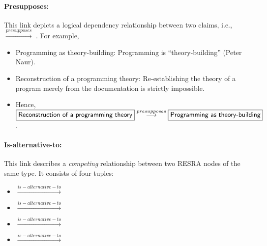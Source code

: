 \paragraph{Presupposes:}

This link depicts a logical dependency relationship between two claims,
i.e.,  \(
\stackrel{presupposes}{\longrightarrow} \) . For
example,

\small
\begin{itemize}
\item {\sf Programming as theory-building:\/} Programming is
  ``theory-building'' (Peter Naur).
  
\item {\sf Reconstruction of a programming theory:} Re-establishing the
  theory of a program merely from the documentation is strictly impossible.
  
\item Hence, \hspace{.01in}\( \fbox{{\sf Reconstruction of a programming
  theory\/}} \stackrel{presupposes}{\longrightarrow} \fbox{{\sf Programming
  as theory-building}} \).
\end{itemize}
\normalsize


\paragraph{Is-alternative-to:}

This link describes a {\it competing\/} relationship between two RESRA
nodes of the same type. It consists of four tuples:

\begin{itemize}
\item {}
\( \stackrel{is-alternative-to}{\longrightarrow}  \)

\item {}
  \( \stackrel{is-alternative-to}{\longrightarrow} \)

\item {}
  \( \stackrel{is-alternative-to}{\longrightarrow} \)

\item {}
  \( \stackrel{is-alternative-to}{\longrightarrow} \)
\end{itemize}

